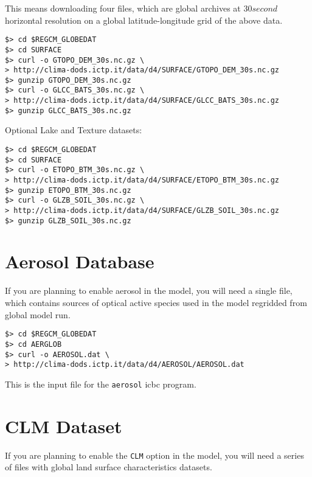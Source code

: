 This means downloading four files, which are global archives at $30 second$
horizontal resolution on a global latitude-longitude grid of the above data.

\begin{Verbatim}
$> cd $REGCM_GLOBEDAT
$> cd SURFACE
$> curl -o GTOPO_DEM_30s.nc.gz \
> http://clima-dods.ictp.it/data/d4/SURFACE/GTOPO_DEM_30s.nc.gz
$> gunzip GTOPO_DEM_30s.nc.gz
$> curl -o GLCC_BATS_30s.nc.gz \
> http://clima-dods.ictp.it/data/d4/SURFACE/GLCC_BATS_30s.nc.gz
$> gunzip GLCC_BATS_30s.nc.gz
\end{Verbatim}

Optional Lake and Texture datasets:

\begin{Verbatim}
$> cd $REGCM_GLOBEDAT
$> cd SURFACE
$> curl -o ETOPO_BTM_30s.nc.gz \
> http://clima-dods.ictp.it/data/d4/SURFACE/ETOPO_BTM_30s.nc.gz
$> gunzip ETOPO_BTM_30s.nc.gz
$> curl -o GLZB_SOIL_30s.nc.gz \
> http://clima-dods.ictp.it/data/d4/SURFACE/GLZB_SOIL_30s.nc.gz
$> gunzip GLZB_SOIL_30s.nc.gz
\end{Verbatim}

\section{Aerosol Database}

If you are planning to enable aerosol in the model, you will need a single
file, which contains sources of optical active species used in the model
regridded from global model run.

\begin{Verbatim}
$> cd $REGCM_GLOBEDAT
$> cd AERGLOB
$> curl -o AEROSOL.dat \
> http://clima-dods.ictp.it/data/d4/AEROSOL/AEROSOL.dat
\end{Verbatim}

This is the input file for the \verb=aerosol= icbc program.

\section{CLM Dataset}
\label{clmdata}

If you are planning to enable the \verb=CLM= option in the model, you will need
a series of files with global land surface characteristics datasets.

